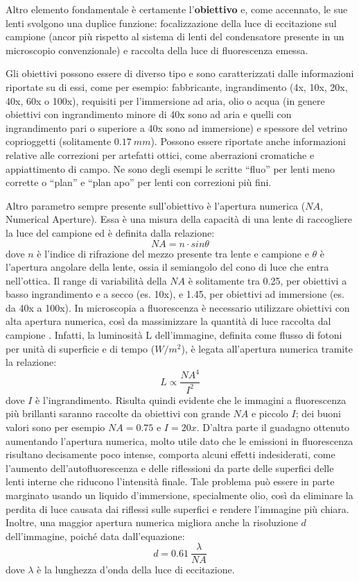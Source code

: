 Altro elemento fondamentale è certamente l'\textbf{obiettivo} e, come accennato, le sue lenti svolgono una duplice funzione: focalizzazione della luce di eccitazione sul campione (ancor più rispetto al sistema di lenti del condensatore presente in un microscopio convenzionale) e raccolta della luce di fluorescenza emessa. 

Gli obiettivi possono essere di diverso tipo e sono caratterizzati dalle informazioni riportate su di essi, come per esempio: fabbricante, ingrandimento (4x, 10x, 20x, 40x, 60x o 100x), requisiti per l'immersione ad aria, olio o acqua (in genere obiettivi con ingrandimento minore di 40x sono ad aria e quelli con ingrandimento pari o superiore a 40x sono ad immersione) e spessore del vetrino coprioggetti (solitamente $0.17\ mm$).  
Possono essere riportate anche informazioni relative alle correzioni per artefatti ottici, come aberrazioni cromatiche e appiattimento di campo.
Ne sono degli esempi le scritte ``fluo'' per lenti meno corrette o ``plan'' e ``plan apo'' per lenti con correzioni più fini. 

Altro parametro sempre presente sull'obiettivo è l'apertura numerica ($NA$, Numerical Aperture). 
Essa è una misura della capacità di una lente di raccogliere la luce del campione ed è definita dalla relazione:
$$ NA = n \cdot sin \theta $$
dove $n$ è l'indice di rifrazione del mezzo presente tra lente e campione e $\theta$ è l'apertura angolare della lente, ossia il semiangolo del cono di luce che entra nell'ottica. 
Il range di variabilità della $NA$ è solitamente tra 0.25, per obiettivi a basso ingrandimento e a secco (es. 10x), e 1.45, per obiettivi ad immersione (es. da 40x a 100x). 
In microscopia a fluorescenza è necessario utilizzare obiettivi con alta apertura numerica, così da massimizzare la quantità di luce raccolta dal campione \cite{NA}.
Infatti, la luminosità L dell'immagine, definita come flusso di fotoni per unità di superficie e di tempo ($W/m^2$), è legata all'apertura numerica tramite la relazione:
$$L  \propto  \frac {NA^4}{I^2}$$
dove $I$ è l'ingrandimento. 
Risulta quindi evidente che le immagini a fluorescenza più brillanti saranno raccolte da obiettivi con grande $NA$ e piccolo $I$; dei buoni valori sono per esempio $NA=0.75$ e $I=20x$.
D'altra parte il guadagno ottenuto aumentando l'apertura numerica, molto utile dato che le emissioni in fluorescenza risultano decisamente poco intense, comporta alcuni effetti indesiderati, come l'aumento dell'autofluorescenza e delle riflessioni da parte delle superfici delle lenti interne che riducono l'intensità finale. 
Tale problema può essere in parte marginato usando un liquido d'immersione, specialmente olio, così da eliminare la perdita di luce
causata dai riflessi sulle superfici e rendere l'immagine più chiara. 
Inoltre, una maggior apertura numerica migliora anche la risoluzione $d$ dell'immagine, poiché data dall'equazione:
$$d = 0.61 \ \frac {\lambda}{NA} $$
dove $\lambda$ è la lunghezza d'onda della luce di eccitazione.

